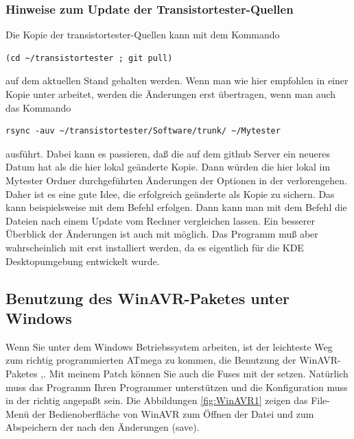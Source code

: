 \subsubsection{Hinweise zum Update der Transistortester-Quellen}
Die Kopie der transistortester-Quellen kann mit dem Kommando
\begin{large} \vspace{-0.4em} \begin{verbatim}
(cd ~/transistortester ; git pull)
\end{verbatim} \end{large}
auf dem aktuellen Stand gehalten werden.
Wenn man wie hier empfohlen in einer Kopie unter  arbeitet,
werden die Änderungen erst übertragen, wenn man auch das Kommando
\begin{large} \vspace{-0.4em} \begin{verbatim}
rsync -auv ~/transistortester/Software/trunk/ ~/Mytester
\end{verbatim} \end{large}
ausführt.
Dabei kann es passieren, daß die  auf dem github Server ein neueres Datum 
hat als die hier lokal geänderte Kopie. Dann würden die hier lokal im Mytester Ordner
durchgeführten Änderungen der Optionen in der  verlorengehen.
Daher ist es eine gute Idee, die erfolgreich geänderte  als Kopie
zu sichern. Das kann beispielsweise mit dem Befehl 
erfolgen. Dann kann man mit dem Befehl 
die Dateien nach einem Update vom Rechner vergleichen lassen.
Ein besserer Überblick der Änderungen ist auch mit 
möglich. Das Programm muß aber wahrscheinlich mit 
erst installiert werden, da es eigentlich für die KDE Desktopumgebung entwickelt wurde.

\newpage

\subsection{Benutzung des WinAVR-Paketes unter Windows}

Wenn Sie unter dem Windows Betriebssystem arbeiten, ist der leichteste Weg zum
richtig programmierten ATmega zu kommen, die Benutzung der WinAVR-Paketes \cite{winavr1},\cite{winavr2}.
Mit meinem Patch \cite{winavr3} können Sie auch die Fuses mit der  setzen.
Natürlich muss das  Programm Ihren Programmer unterstützen und die Konfiguration muss in
der  richtig angepaßt sein.
Die Abbildungen \ref{fig:WinAVR1} zeigen das File-Menü der Bedienoberfläche von WinAVR zum
Öffnen der Datei  und zum Abspeichern der  nach den Änderungen (save).

